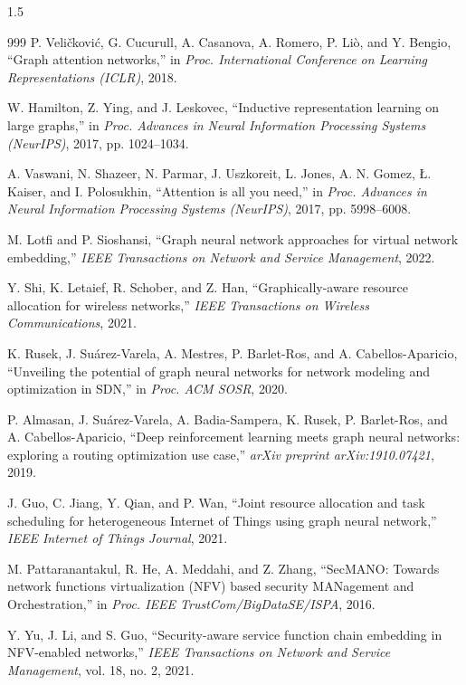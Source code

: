 \documentclass[A4paper,12pt]{report}
\theoremstyle{plain}
\theoremstyle{definition}
\theoremstyle{remark}
\numberwithin{equation}{section}
\begin{document}
\begin{spacing}{1.5}
\begin{thebibliography}{999}
P. Veli\v{c}kovi\'{c}, G. Cucurull, A. Casanova, A. Romero, P. Li\`{o}, and Y. Bengio, ``Graph attention networks,'' in \textit{Proc. International Conference on Learning Representations (ICLR)}, 2018.

W. Hamilton, Z. Ying, and J. Leskovec, ``Inductive representation learning on large graphs,'' in \textit{Proc. Advances in Neural Information Processing Systems (NeurIPS)}, 2017, pp. 1024--1034.

A. Vaswani, N. Shazeer, N. Parmar, J. Uszkoreit, L. Jones, A. N. Gomez, \L{}. Kaiser, and I. Polosukhin, ``Attention is all you need,'' in \textit{Proc. Advances in Neural Information Processing Systems (NeurIPS)}, 2017, pp. 5998--6008.

M. Lotfi and P. Sioshansi, ``Graph neural network approaches for virtual network embedding,'' \textit{IEEE Transactions on Network and Service Management}, 2022.

Y. Shi, K. Letaief, R. Schober, and Z. Han, ``Graphically-aware resource allocation for wireless networks,'' \textit{IEEE Transactions on Wireless Communications}, 2021.

K. Rusek, J. Su\'{a}rez-Varela, A. Mestres, P. Barlet-Ros, and A. Cabellos-Aparicio, ``Unveiling the potential of graph neural networks for network modeling and optimization in SDN,'' in \textit{Proc. ACM SOSR}, 2020.

P. Almasan, J. Su\'{a}rez-Varela, A. Badia-Sampera, K. Rusek, P. Barlet-Ros, and A. Cabellos-Aparicio, ``Deep reinforcement learning meets graph neural networks: exploring a routing optimization use case,'' \textit{arXiv preprint arXiv:1910.07421}, 2019.

J. Guo, C. Jiang, Y. Qian, and P. Wan, ``Joint resource allocation and task scheduling for heterogeneous Internet of Things using graph neural network,'' \textit{IEEE Internet of Things Journal}, 2021.

M. Pattaranantakul, R. He, A. Meddahi, and Z. Zhang, ``SecMANO: Towards network functions virtualization (NFV) based security MANagement and Orchestration,'' in \textit{Proc. IEEE TrustCom/BigDataSE/ISPA}, 2016.

Y. Yu, J. Li, and S. Guo, ``Security-aware service function chain embedding in NFV-enabled networks,'' \textit{IEEE Transactions on Network and Service Management}, vol. 18, no. 2, 2021.


\end{thebibliography}
\end{spacing}
\end{document}
